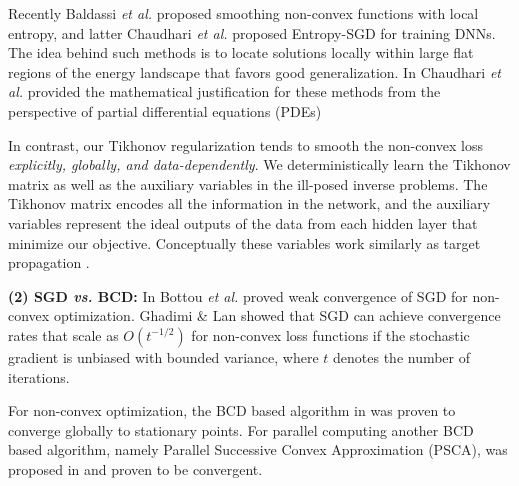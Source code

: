 \documentclass{article}
\def\vs{\emph{vs. }}
\def\etal{\emph{et al. }}
\begin{document}
	Recently Baldassi \etal \cite{baldassi2015subdominant} proposed smoothing non-convex functions with local entropy, and latter Chaudhari \etal \cite{chaudhari2016entropy} proposed Entropy-SGD for training DNNs. The idea behind such methods is to locate solutions locally within large flat regions of the energy landscape that favors good generalization. In \cite{chaudhari2017deep} Chaudhari \etal provided the mathematical justification for these methods from the perspective of partial differential equations (PDEs)
	
	In contrast, our Tikhonov regularization tends to smooth the non-convex loss {\em explicitly, globally, and data-dependently}. We deterministically learn the Tikhonov matrix as well as the auxiliary variables in the ill-posed inverse problems. The Tikhonov matrix encodes all the information in the network, and the auxiliary variables represent the ideal outputs of the data from each hidden layer that minimize our objective. Conceptually these variables work similarly as target propagation \cite{bengio2014auto}.
	
	
	{\bf (2) SGD \vs BCD:} 
	In \cite{bottou2016optimization} Bottou \etal proved weak convergence of SGD for non-convex optimization. Ghadimi \& Lan \cite{ghadimi2013stochastic} showed that SGD can achieve convergence rates that scale as $O\left(t^{-1/2}\right)$ for non-convex loss functions if the stochastic gradient is unbiased with bounded variance, where $t$ denotes the number of iterations.
	
	For non-convex optimization, the BCD based algorithm in \cite{xu2014globally} was proven to converge globally to stationary points. For parallel computing another BCD based algorithm, namely Parallel Successive Convex Approximation (PSCA), was proposed in \cite{razaviyayn2014parallel} and proven to be convergent.
	
\end{document}
